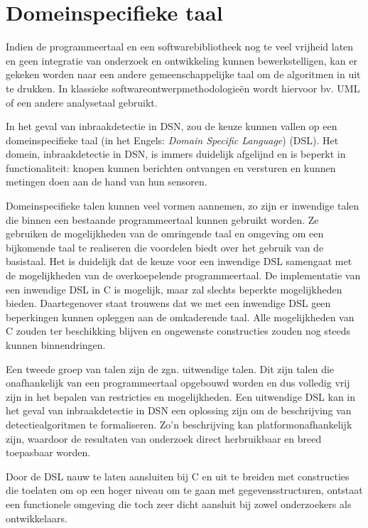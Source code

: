 \section{Domeinspecifieke taal}
\label{section:solution-dsl}

Indien de programmeertaal en een softwarebibliotheek nog te veel vrijheid laten
en geen integratie van onderzoek en ontwikkeling kunnen bewerkstelligen, kan er
gekeken worden naar een andere gemeenschappelijke taal om de algoritmen in uit
te drukken. In klassieke softwareontwerpmethodologie\"en wordt hiervoor bv. UML
\citep{url:uml} of een andere analysetaal gebruikt.

In het geval van inbraakdetectie in DSN, zou de keuze kunnen vallen op een
domeinspecifieke taal (in het Engels: \emph{Domain Specific Language})
(DSL)\citep{van2000domain, mernik2005and, fowler2010domain}. Het domein,
inbraakdetectie in DSN, is immers duidelijk afgelijnd en is beperkt in
functionaliteit: knopen kunnen berichten ontvangen en versturen en kunnen
metingen doen aan de hand van hun sensoren.

Domeinspecifieke talen kunnen veel vormen aannemen, zo zijn er inwendige talen
die binnen een bestaande programmeertaal kunnen gebruikt worden. Ze gebruiken
de mogelijkheden van de omringende taal en omgeving om een bijkomende taal te
realiseren die voordelen biedt over het gebruik van de basistaal. Het is
duidelijk dat de keuze voor een inwendige DSL samengaat met de mogelijkheden
van de overkoepelende programmeertaal. De implementatie van een inwendige DSL
in C is mogelijk, maar zal slechts beperkte mogelijkheden bieden. Daartegenover
staat trouwens dat we met een inwendige DSL geen beperkingen kunnen opleggen
aan de omkaderende taal. Alle mogelijkheden van C zouden ter beschikking
blijven en ongewenste constructies zouden nog steeds kunnen binnendringen.

Een tweede groep van talen zijn de zgn. uitwendige talen. Dit zijn talen die
onafhankelijk van een programmeertaal opgebouwd worden en dus volledig vrij
zijn in het bepalen van restricties en mogelijkheden. Een uitwendige DSL kan in
het geval van inbraakdetectie in DSN een oplossing zijn om de beschrijving van
detectiealgoritmen te formaliseren. Zo'n beschrijving kan platformonafhankelijk
zijn, waardoor de resultaten van onderzoek direct herbruikbaar en breed
toepasbaar worden.

Door de DSL nauw te laten aansluiten bij C en uit te breiden met constructies
die toelaten om op een hoger niveau om te gaan met gegevensstructuren, ontstaat
een functionele omgeving die toch zeer dicht aansluit bij zowel onderzoekers
als ontwikkelaars.

